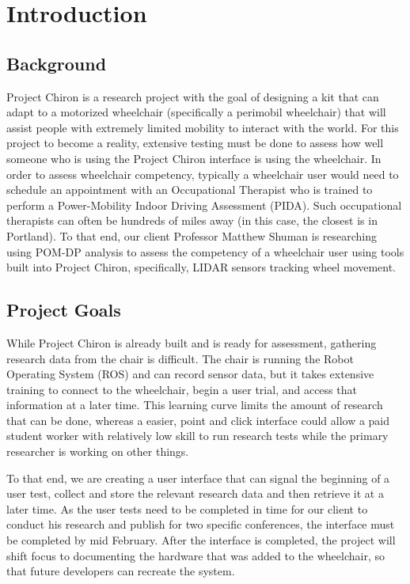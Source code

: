 \documentclass[onecolumn, draftclsnofoot,10pt, compsoc]{IEEEtran}
\begin{document}
\section{Introduction}
\subsection{Background}
Project Chiron is a research project with the goal of designing a kit that can adapt to a motorized wheelchair (specifically a perimobil wheelchair) that will assist people with extremely limited mobility to interact with the world. For this project to become a reality, extensive testing must be done to assess how well someone who is using the Project Chiron interface is using the wheelchair. In order to assess wheelchair competency, typically a wheelchair user would need to schedule an appointment with an Occupational Therapist who is trained to perform a Power-Mobility Indoor Driving
Assessment (PIDA). Such occupational therapists can often be hundreds of miles away (in this case, the closest is in Portland). To that end, our client Professor Matthew Shuman is researching using POM-DP analysis to assess the competency of a wheelchair user using tools built into Project Chiron, specifically, LIDAR sensors tracking wheel movement. 
\subsection{Project Goals}
While Project Chiron is already built and is ready for assessment, gathering research data from the chair is difficult. The chair is running the Robot Operating System (ROS) and can record sensor data, but it takes extensive training to connect to the wheelchair, begin a user trial, and access that information at a later time. This learning curve limits the amount of research that can be done, whereas a easier, point and click interface could allow a paid student worker with relatively low skill to run research tests while the primary researcher is working on other things.

To that end, we are creating a user interface that can signal the beginning of a user test, collect and store the relevant research data and then retrieve it at a later time. As the user tests need to be completed in time for our client to conduct his research and publish for two specific conferences, the interface must be completed by mid February. After the interface is completed, the project will shift focus to documenting the hardware that was added to the wheelchair, so that future developers can recreate the system.
\end{document}
